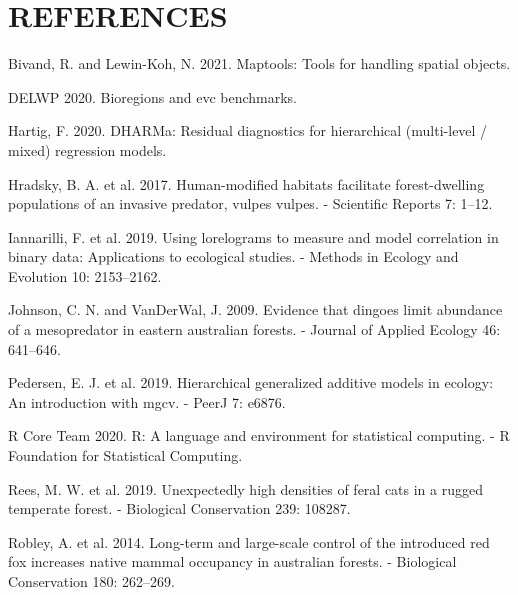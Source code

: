 \documentclass[]{elsarticle} %
\begin{document}
\newpage

\hypertarget{references}{%
\section*{REFERENCES}\label{references}}

\hypertarget{refs}{}
\leavevmode\hypertarget{ref-maptools}{}%
Bivand, R. and Lewin-Koh, N. 2021. Maptools: Tools for handling spatial objects.

\leavevmode\hypertarget{ref-delwp2020}{}%
DELWP 2020. Bioregions and evc benchmarks.

\leavevmode\hypertarget{ref-DHARMa}{}%
Hartig, F. 2020. DHARMa: Residual diagnostics for hierarchical (multi-level / mixed) regression models.

\leavevmode\hypertarget{ref-hradsky2017human}{}%
Hradsky, B. A. et al. 2017. Human-modified habitats facilitate forest-dwelling populations of an invasive predator, vulpes vulpes. - Scientific Reports 7: 1--12.

\leavevmode\hypertarget{ref-https:ux2fux2fdoi.orgux2f10.1111ux2f2041-210X.13308}{}%
Iannarilli, F. et al. 2019. Using lorelograms to measure and model correlation in binary data: Applications to ecological studies. - Methods in Ecology and Evolution 10: 2153--2162.

\leavevmode\hypertarget{ref-https:ux2fux2fdoi.orgux2f10.1111ux2fj.1365-2664.2009.01650.x}{}%
Johnson, C. N. and VanDerWal, J. 2009. Evidence that dingoes limit abundance of a mesopredator in eastern australian forests. - Journal of Applied Ecology 46: 641--646.

\leavevmode\hypertarget{ref-pedersen2019hierarchical}{}%
Pedersen, E. J. et al. 2019. Hierarchical generalized additive models in ecology: An introduction with mgcv. - PeerJ 7: e6876.

\leavevmode\hypertarget{ref-R}{}%
R Core Team 2020. R: A language and environment for statistical computing. - R Foundation for Statistical Computing.

\leavevmode\hypertarget{ref-REES2019108287}{}%
Rees, M. W. et al. 2019. Unexpectedly high densities of feral cats in a rugged temperate forest. - Biological Conservation 239: 108287.

\leavevmode\hypertarget{ref-ROBLEY2014262}{}%
Robley, A. et al. 2014. Long-term and large-scale control of the introduced red fox increases native mammal occupancy in australian forests. - Biological Conservation 180: 262--269.
\end{document}
